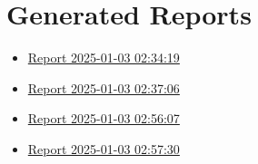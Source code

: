 \documentclass[11pt]{article}
\begin{document}
\section{Generated Reports}
\label{sec:orgaad0769}
\begin{itemize}
\item \href{report\_20250103-023419.org}{Report 2025-01-03 02:34:19}
\item \href{report\_20250103-023706.org}{Report 2025-01-03 02:37:06}
\item \href{report\_20250103-025607.org}{Report 2025-01-03 02:56:07}
\item \href{report\_20250103-025730.org}{Report 2025-01-03 02:57:30}
\end{itemize}
\end{document}
